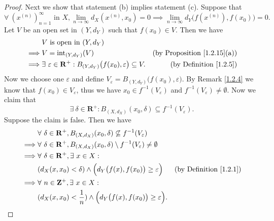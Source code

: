 \begin{proof}
    Next we show that statement (b) implies statement (c).
    Suppose that
    \[
        \forall\ (x^{(n)})_{n = 1}^\infty \text{ in } X, \lim_{n \to \infty} d_X(x^{(n)}, x_0) = 0 \implies \lim_{n \to \infty} d_Y\big(f(x^{(n)}), f(x_0)\big) = 0.
    \]
    Let \(V\) be an open set in \((Y, d_Y)\) such that \(f(x_0) \in V\).
    Then we have
    \begin{align*}
                 & V \text{ is open in } (Y, d_Y)                                                                                                           \\
        \implies & V = \text{int}_{(Y, d_Y)}(V)                                                                   & \text{(by Proposition \ref{1.2.15}(a))} \\
        \implies & \exists\ \varepsilon \in \mathbf{R}^+ : B_{(Y, d_Y)}\big(f(x_0), \varepsilon\big) \subseteq V. & \text{(by Definition \ref{1.2.5})}
    \end{align*}
    Now we choose one \(\varepsilon\) and define \(V_\varepsilon = B_{(Y, d_Y)}\big(f(x_0), \varepsilon\big)\).
    By Remark \ref{1.2.4} we know that \(f(x_0) \in V_\varepsilon\), thus we have \(x_0 \in f^{-1}(V_\varepsilon)\) and \(f^{-1}(V_\varepsilon) \neq \emptyset\).
    Now we claim that
    \[
        \exists\ \delta \in \mathbf{R}^+ : B_{(X, d_X)}(x_0, \delta) \subseteq f^{-1}(V_\varepsilon).
    \]
    Suppose the claim is false.
    Then we have
    \begin{align*}
                 & \forall\ \delta \in \mathbf{R}^+, B_{(X, d_X)}(x_0, \delta) \not\subseteq f^{-1}(V_\varepsilon)                                                 \\
        \implies & \forall\ \delta \in \mathbf{R}^+, B_{(X, d_X)}(x_0, \delta) \setminus f^{-1}(V_\varepsilon) \neq \emptyset                                      \\
        \implies & \forall\ \delta \in \mathbf{R}^+, \exists\ x \in X :                                                                                            \\
                 & (d_X(x, x_0) < \delta) \land \Big(d_Y\big(f(x), f(x_0)\big) \geq \varepsilon\Big)                          & \text{(by Definition \ref{1.2.1})} \\
        \implies & \forall\ n \in \mathbf{Z}^+, \exists\ x \in X :                                                                                                 \\
                 & (d_X(x, x_0) < \frac{1}{n}) \land \Big(d_Y\big(f(x), f(x_0)\big) \geq \varepsilon\Big).

\end{align*}
\end{proof}
